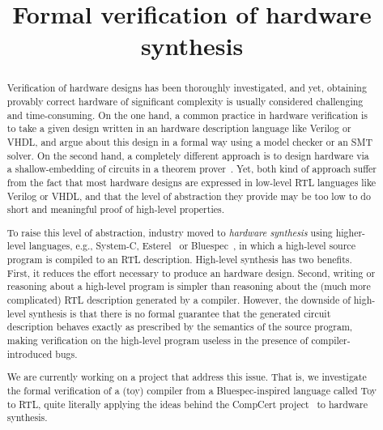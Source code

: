 \documentclass[preprint]{sigplanconf}
\title{Formal verification of hardware synthesis}
\newcommand{\project}{Toy}
\begin{document}
\maketitle

\begin{abstract}
Verification of hardware designs has been thoroughly investigated, and
yet, obtaining provably correct hardware of significant complexity is
usually considered challenging and time-consuming. 
%
On the one hand, a common practice in hardware verification is to  take a given design
written in an hardware description language like Verilog or VHDL,
and argue about this design in a formal way using a model checker or
an SMT solver. 
%
On the second hand, a completely different approach is to design hardware via a
shallow-embedding of circuits in a theorem
prover~\cite{hanna-veritas,UCAM-CL-TR-77,hunt89,vamp,certifying-circuits-in-type-theory}. 
%
Yet, both kind of approach suffer from the fact that most hardware
designs are expressed in low-level RTL languages like Verilog or 
VHDL, and that the level of abstraction they provide may be too low to
do short and meaningful proof of high-level properties. 

\medskip

To raise this level of abstraction, industry moved to \emph{hardware
  synthesis} using higher-level languages, e.g., System-C,
Esterel~\cite{DBLP:conf/birthday/Berry00} or
Bluespec~\cite{bluespec}, in which a high-level source program is
compiled to an RTL description. 
%
High-level synthesis has two benefits. 
%
First, it reduces the effort necessary to produce an hardware design.
%
Second, writing or reasoning about a high-level program is simpler
than reasoning about the (much more complicated) RTL description
generated by a compiler.
%
However, the downside of high-level synthesis is that there is no
formal guarantee that the generated circuit description behaves
exactly as prescribed by the semantics of the source
program, making verification on the high-level program useless in the
presence of compiler-introduced bugs.
%

\medskip

We are currently working on a project that address this issue.  That
is, we investigate the formal verification of a (toy) compiler from a
Bluespec-inspired language called \project{} to RTL, quite
literally applying the ideas behind the CompCert
project~\cite{Leroy-Compcert-CACM} to hardware synthesis. 

\medskip


\end{abstract}
\end{document}
